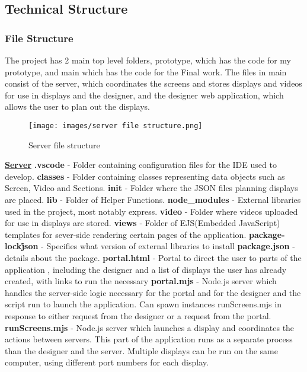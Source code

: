 \documentclass{article}
\begin{document}
\subsection{Technical Structure}
\subsubsection{File Structure}
The project has 2 main top level folders, prototype, which has the code for my prototype, and main which has the code for the Final work. The files in main consist of the server, which coordinates the screens and stores displays and videos for use in displays and the designer, and the designer web application, which allows the user to plan out the displays. 
 
 \begin{figure}[h]
    \centering
    \texttt{[image: images/server file structure.png]}
    \caption{Server file structure}
    \label{fig:my_label}
\end{figure}

\underline{\textbf{Server}}\newline
\textbf{.vscode} -  Folder containing configuration files for the IDE used to develop.\newline
\textbf{classes} - Folder containing classes representing data objects such as Screen, Video and Sections.\newline
\textbf{init} - Folder where the JSON files planning displays are placed.\newline
\textbf{lib} - Folder of Helper Functions. \newline
\textbf{node\_modules} - External libraries used in the project, most notably express.\newline
\textbf{video} - Folder where videos uploaded for use in displays are stored. \newline
\textbf{views} - Folder of EJS(Embedded JavaScript) templates for sever-side rendering certain pages of the application. \newline
\textbf{package-lock\.json} - Specifies what version of external libraries to install \newline
\textbf{package.json} - details about the package. \newline
\textbf{portal.html} - Portal to direct the user to parts of the application , including the designer and a list of displays the user has already created, with links to run the necessary \newline
\textbf{portal.mjs} - Node.js server which handles the server-side logic necessary for the portal and for the designer and the script run to launch the application. Can spawn instances runScreens.mjs in response to either request from the designer or a request from the portal. \newline
\textbf{runScreens.mjs} - Node.js server which launches a display and coordinates the actions between servers. This part of the application runs as a separate process than the designer and the server. Multiple displays can be run on the same computer, using different port numbers for each display. \newline
\end{document}
